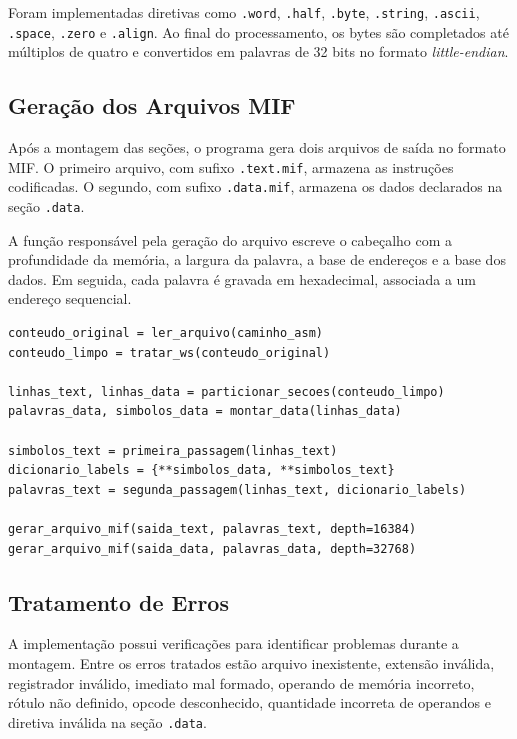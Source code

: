 \documentclass[conference]{IEEEtran}
\begin{document}
Foram implementadas diretivas como \texttt{.word}, \texttt{.half}, \texttt{.byte}, \texttt{.string}, \texttt{.ascii}, \texttt{.space}, \texttt{.zero} e \texttt{.align}. Ao final do processamento, os bytes são completados até múltiplos de quatro e convertidos em palavras de 32 bits no formato \textit{little-endian}.

\subsection{Geração dos Arquivos MIF}

Após a montagem das seções, o programa gera dois arquivos de saída no formato MIF. O primeiro arquivo, com sufixo \texttt{.text.mif}, armazena as instruções codificadas. O segundo, com sufixo \texttt{.data.mif}, armazena os dados declarados na seção \texttt{.data}.

A função responsável pela geração do arquivo escreve o cabeçalho com a profundidade da memória, a largura da palavra, a base de endereços e a base dos dados. Em seguida, cada palavra é gravada em hexadecimal, associada a um endereço sequencial.

\begin{lstlisting}[style=pythonstyle, caption={Fluxo principal simplificado da aplicação.}, label={lst:main_fluxo}]
conteudo_original = ler_arquivo(caminho_asm)
conteudo_limpo = tratar_ws(conteudo_original)

linhas_text, linhas_data = particionar_secoes(conteudo_limpo)
palavras_data, simbolos_data = montar_data(linhas_data)

simbolos_text = primeira_passagem(linhas_text)
dicionario_labels = {**simbolos_data, **simbolos_text}
palavras_text = segunda_passagem(linhas_text, dicionario_labels)

gerar_arquivo_mif(saida_text, palavras_text, depth=16384)
gerar_arquivo_mif(saida_data, palavras_data, depth=32768)
\end{lstlisting}

\subsection{Tratamento de Erros}

A implementação possui verificações para identificar problemas durante a montagem. Entre os erros tratados estão arquivo inexistente, extensão inválida, registrador inválido, imediato mal formado, operando de memória incorreto, rótulo não definido, opcode desconhecido, quantidade incorreta de operandos e diretiva inválida na seção \texttt{.data}.
\end{document}

